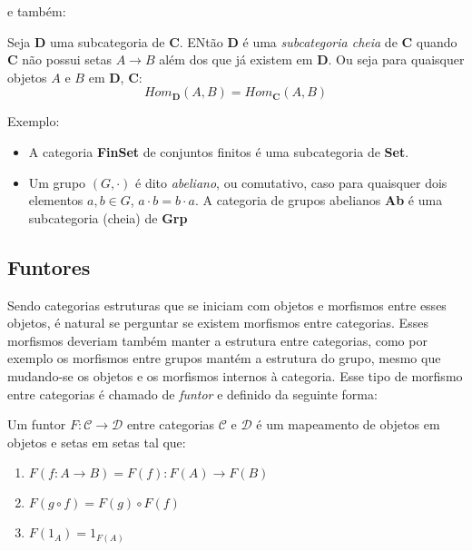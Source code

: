 \documentclass[../main.tex]{subfiles}
\begin{document}
e também:

\begin{definition}
    Seja $\textbf{D}$ uma subcategoria de $\textbf{C}$. ENtão $\textbf{D}$ é uma \emph{subcategoria cheia} de \textbf{C} quando \textbf{C} não possui setas $A \to B$ além dos que já existem em $\textbf{D}$. Ou seja para quaisquer objetos $A$ e $B$ em $\textbf{D}$, $\textbf{C}$: $$Hom_{\textbf{D}}(A, B) = Hom_{\textbf{C}}(A, B)$$
\end{definition}

Exemplo:

\begin{itemize}
    \item A categoria \textbf{FinSet} de conjuntos finitos é uma subcategoria de \textbf{Set}.
    \item Um grupo $(G, \cdot)$ é dito \emph{abeliano}, ou comutativo, caso para quaisquer dois elementos $a, b \in G$, $a \cdot b = b \cdot a$. A categoria de grupos abelianos \textbf{Ab} é uma subcategoria (cheia) de \textbf{Grp}
\end{itemize}

\subsection{Funtores}

Sendo categorias estruturas que se iniciam com objetos e morfismos entre esses objetos, é natural se perguntar se existem morfismos entre categorias. Esses morfismos deveriam também manter a estrutura entre categorias, como por exemplo os morfismos entre grupos mantém a estrutura do grupo, mesmo que mudando-se os objetos e os morfismos internos à categoria. Esse tipo de morfismo entre categorias é chamado de \emph{funtor} e definido da seguinte forma:

\begin{definition}
    Um funtor $F : \mathcal{C} \to \mathcal{D}$ entre categorias $\mathcal{C}$ e $\mathcal{D}$ é um mapeamento de objetos em objetos e setas em setas tal que:
    \begin{enumerate}
        \item $F(f : A \to B) = F(f) : F(A) \to F(B)$
        \item $F(g \circ f) = F(g) \circ F(f)$
        \item $F(1_A) = 1_{F(A)}$
    \end{enumerate}
\end{definition}
\end{document}
